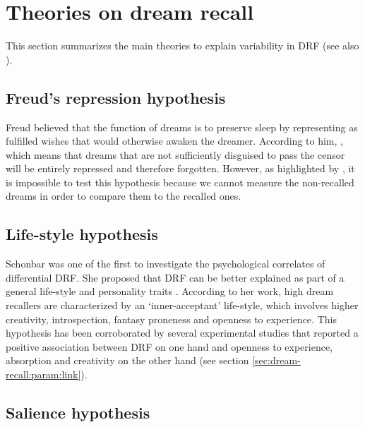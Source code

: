 \section{Theories on dream recall}
\label{sec:dream-recall:theories}

This section summarizes the main theories to explain variability in DRF (see also \citealp{schredl_dream_1996}).

\subsection{Freud’s repression hypothesis}
\label{sec:dream-recall:theories:freud}

Freud believed that the function of dreams is to preserve sleep by representing as fulfilled wishes that would otherwise awaken the dreamer. According to him,  \citep{freud_interpretation_1900}, which means that dreams that are not sufficiently disguised to pass the censor will be entirely repressed and therefore forgotten. However, as highlighted by \citet{schredl_dream_1999}, it is impossible to test this hypothesis because we cannot measure the non-recalled dreams in order to compare them to the recalled ones.

\subsection{Life-style hypothesis}
\label{sec:dream-recall:theories:life-style}

Schonbar was one of the first to investigate the psychological correlates of differential DRF. She proposed that DRF can be better explained as part of a general life-style and personality traits \citep{schonbar_differential_1965}. According to her work, high dream recallers are characterized by an ‘inner-acceptant’ life-style, which involves higher creativity, introspection, fantasy proneness and openness to experience. This hypothesis has been corroborated by several experimental studies that reported a positive association between DRF on one hand and openness to experience, absorption and creativity on the other hand (see section \ref{sec:dream-recall:param:link}).

\subsection{Salience hypothesis}
\label{sec:dream-recall:theories:salience}

